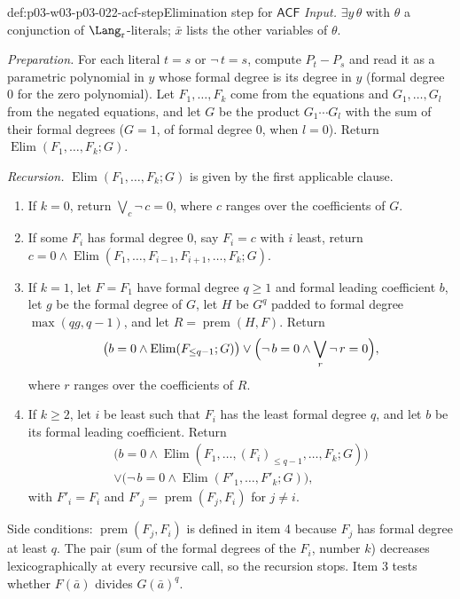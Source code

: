 \begin{hbmethod}{def:p03-w03-p03-022-acf-step}{Elimination step for \(\mathsf{ACF}\)}
\emph{Input.} \(\exists y\,\theta\) with \(\theta\) a conjunction of
\(\Lang_{\mathrm r}\)-literals; \(\bar x\) lists the other variables of
\(\theta\).

\emph{Preparation.} For each literal \(t=s\) or \(\neg\,t=s\), compute
\(P_t-P_s\) and read it as a parametric polynomial in \(y\) whose formal
degree is its degree in \(y\) (formal degree \(0\) for the zero
polynomial). Let \(F_1,\ldots,F_k\) come from the equations and
\(G_1,\ldots,G_l\) from the negated equations, and let \(G\) be the product
\(G_1\cdots G_l\) with the sum of their formal degrees (\(G=1\), of formal
degree \(0\), when \(l=0\)). Return \(\operatorname{Elim}(F_1,\ldots,F_k;G)\).

\emph{Recursion.} \(\operatorname{Elim}(F_1,\ldots,F_k;G)\) is given by the
first applicable clause.
\begin{enumerate}
\item If \(k=0\), return \(\bigvee_c\neg\,c=0\), where \(c\) ranges over
  the coefficients of \(G\).
\item If some \(F_i\) has formal degree \(0\), say \(F_i=c\) with \(i\)
  least, return
  \(c=0\land\operatorname{Elim}(F_1,\ldots,F_{i-1},F_{i+1},\ldots,F_k;G)\).
\item If \(k=1\), let \(F=F_1\) have formal degree \(q\ge1\) and formal
  leading coefficient \(b\), let \(g\) be the formal degree of \(G\), let
  \(H\) be \(G^q\) padded to formal degree \(\max(qg,q-1)\), and let
  \(R=\operatorname{prem}(H,F)\). Return
  \[
  \bigl(b=0\land\operatorname{Elim}(F_{\le q-1};G)\bigr)\lor
  \Bigl(\neg\,b=0\land\bigvee_r\neg\,r=0\Bigr),
  \]
  where \(r\) ranges over the coefficients of \(R\).
\item If \(k\ge2\), let \(i\) be least such that \(F_i\) has the least
  formal degree \(q\), and let \(b\) be its formal leading coefficient.
  Return
  \begin{multline*}
  \bigl(b=0\land\operatorname{Elim}(F_1,\ldots,(F_i)_{\le q-1},\ldots,F_k;G)\bigr)\\
  \lor\bigl(\neg\,b=0\land\operatorname{Elim}(F'_1,\ldots,F'_k;G)\bigr),
  \end{multline*}
  with \(F'_i=F_i\) and \(F'_j=\operatorname{prem}(F_j,F_i)\) for \(j\ne i\).
\end{enumerate}
Side conditions: \(\operatorname{prem}(F_j,F_i)\) is defined in item 4
because \(F_j\) has formal degree at least \(q\). The pair (sum of the
formal degrees of the \(F_i\), number \(k\)) decreases lexicographically
at every recursive call, so the recursion stops. Item 3 tests whether
\(F(\bar a)\) divides \(G(\bar a)^q\).
\end{hbmethod}

